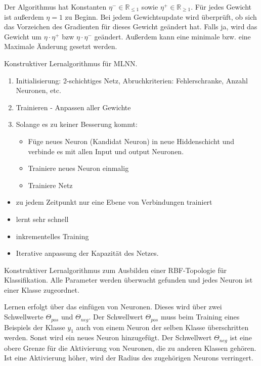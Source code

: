 Der Algorithmus hat Konstanten $\eta^- \in \mathbb{R}_{\le 1}$ sowie
$\eta^+ \in \mathbb{R}_{\ge 1}$. Für jedes Gewicht ist außerdem
$\eta=1$ zu Beginn. Bei jedem Gewichtsupdate wird überprüft, ob sich das Vorzeichen des
Gradienten für dieses Gewicht geändert hat. Falls ja, wird das Gewicht
um $\eta \cdot \eta^+$ bzw $\eta \cdot \eta^-$ geändert. Außerdem
kann eine minimale bzw. eine Maximale Änderung gesetzt werden.


Konstruktiver Lernalgorithmus für MLNN.

\begin{enumerate}
    \item Initialisierung: 2-schichtiges Netz, Abruchkriterien: Fehlerschranke,
    Anzahl Neuronen, etc.
    \item Trainieren - Anpassen aller Gewichte
    \item Solange es zu keiner Besserung kommt:
    \begin{itemize}
        \item Füge neues Neuron (Kandidat Neuron) in neue Hiddenschicht und verbinde
        es mit allen Input und output Neuronen.
        \item Trainiere neues Neuron einmalig
        \item Trainiere Netz
    \end{itemize}
\end{enumerate}

\begin{itemize}
    \item zu jedem Zeitpunkt nur eine Ebene von Verbindungen trainiert
    \item lernt sehr schnell
    \item inkrementelles Training
    \item Iterative anpassung der Kapazität des Netzes.
\end{itemize}
Konstruktiver Lernalgorithmus zum Ausbilden einer RBF-Topologie für Klassifikation.
Alle Parameter werden überwacht gefunden und jedes Neuron ist einer Klasse zugeordnet.

Lernen erfolgt über das einfügen von Neuronen. Dieses wird über zwei Schwellwerte
$\Theta_{pos}$ und $\Theta_{neg}$. Der Schwellwert $\Theta_{pos}$ muss beim Training
eines Beispiels der Klasse $y_1$ auch von einem Neuron der selben Klasse überschritten
werden. Sonst wird ein neues Neuron hinzugefügt.
Der Schwellwert $\Theta_{neg}$ ist eine obere Grenze für die Aktivierung von Neuronen,
die zu anderen Klassen gehören. Ist eine Aktivierung höher, wird der Radius des
zugehörigen Neurons verringert.
